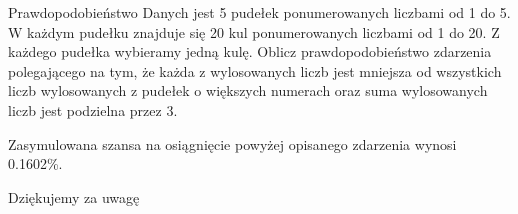 \documentclass{beamer}
\begin{document}
  \begin{frame}{Prawdopodobieństwo}
    Danych jest 5 pudełek ponumerowanych liczbami od 1 do 5. W każdym pudełku znajduje się 20 kul ponumerowanych liczbami od 1 do 20.
    Z każdego pudełka wybieramy jedną kulę. Oblicz prawdopodobieństwo zdarzenia polegającego na tym, że każda z wylosowanych liczb jest
    mniejsza od wszystkich liczb wylosowanych z pudełek o większych numerach oraz suma wylosowanych liczb jest podzielna przez 3.  
    
    Zasymulowana szansa na osiągnięcie powyżej opisanego zdarzenia wynosi 0.1602\%. 
  \end{frame}

  \begin{frame}
    \centering \huge Dziękujemy za uwagę 
  \end{frame}
\end{document}
